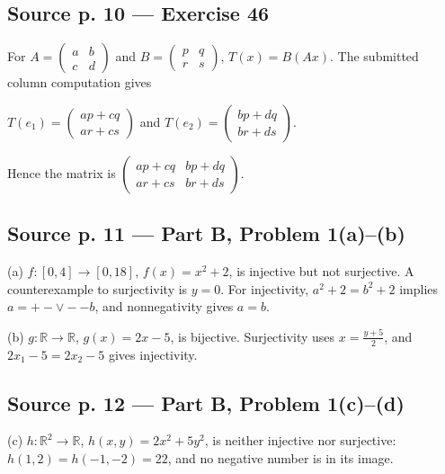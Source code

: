 \subsection{Source p. 10 --- Exercise 46}

For \(A = \begin{pmatrix}
a & b \\
c & d
\end{pmatrix}\) and \(B = \begin{pmatrix}
p & q \\
r & s
\end{pmatrix}\), \(T(x) = B\left( {Ax} \right)\). The submitted column computation gives

\(T\left( e_{1} \right) = \begin{pmatrix}
{ap + cq} \\
{ar + cs}
\end{pmatrix}\) and \(T\left( e_{2} \right) = \begin{pmatrix}
{bp + dq} \\
{br + ds}
\end{pmatrix}\).

Hence the matrix is \(\begin{pmatrix}
{ap + cq} & {bp + dq} \\
{ar + cs} & {br + ds}
\end{pmatrix}\).

\subsection{Source p. 11 --- Part B, Problem 1(a)--(b)}

(a) \(f:\left\lbrack {0,4} \right\rbrack\rightarrow\left\lbrack {0,18} \right\rbrack\), \(f(x) = x^{2} + 2\), is injective but not surjective. A counterexample to surjectivity is \(y = 0\). For injectivity, \(a^{2} + 2 = b^{2} + 2\) implies \(a = + - \vee - - b\), and nonnegativity gives \(a = b\).

(b) \(g:\mathbb{R}\rightarrow\mathbb{R}\), \(g(x) = 2x - 5\), is bijective. Surjectivity uses \(x = \frac{y + 5}{2}\), and \(2x_{1} - 5 = 2x_{2} - 5\) gives injectivity.

\subsection{Source p. 12 --- Part B, Problem 1(c)--(d)}

(c) \(h:\mathbb{R}^{2}\rightarrow\mathbb{R}\), \(h\left( {x,y} \right) = 2x^{2} + 5y^{2}\), is neither injective nor surjective: \(h\left( {1,2} \right) = h\left( {- 1, - 2} \right) = 22\), and no negative number is in its image.

